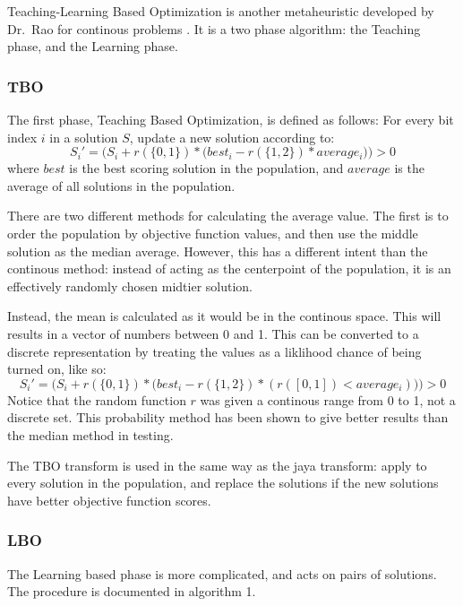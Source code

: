 \documentclass[11pt, letterpaper, onecolumn]{article}
\begin{document}
Teaching-Learning Based Optimization is another metaheuristic developed by Dr.~Rao for continous problems \cite{TLBO}. It is a two phase algorithm: the Teaching phase, and the Learning phase.

\subsubsection{TBO}

The first phase, Teaching Based Optimization, is defined as follows: For every bit index $i$ in a solution $S$, update a new solution according to: 
\begin{equation}
S_i' = \Big(S_i + r(\{0, 1\})*\big(best_i - r(\{1, 2\})*average_i\big)\Big) > 0
\end{equation}
where $best$ is the best scoring solution in the population, and $average$ is the average of all solutions in the population. 

There are two different methods for calculating the average value. The first is to order the population by objective function values, and then use the middle solution as the median average. However, this has a different intent than the continous method: instead of acting as the centerpoint of the population, it is an effectively randomly chosen midtier solution. 

Instead, the mean is calculated as it would be in the continous space. This will results in a vector of numbers between 0 and 1. This can be converted to a discrete representation by treating the values as a liklihood chance of being turned on, like so: 
\begin{equation}
S_i' = \Big(S_i + r(\{0, 1\})*\big(best_i - r(\{1, 2\})*(r([0, 1]) < average_i)\big)\Big) > 0
\end{equation}
Notice that the random function $r$ was given a continous range from 0 to 1, not a discrete set. This probability method has been shown to give better results than the median method in testing. 

The TBO transform is used in the same way as the jaya transform: apply to every solution in the population, and replace the solutions if the new solutions have better objective function scores.

\subsubsection{LBO}

The Learning based phase is more complicated, and acts on pairs of solutions. The procedure is documented in algorithm 1. 
\end{document}
